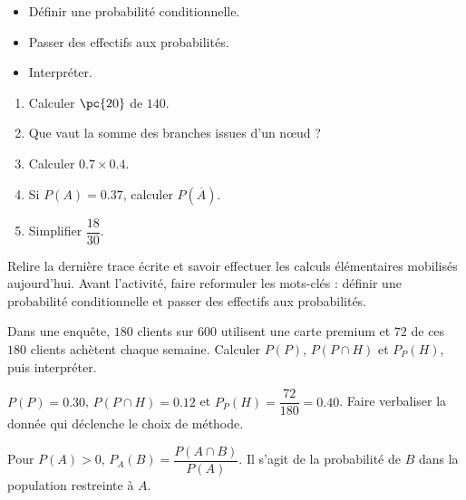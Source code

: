 \begin{objectives}\begin{itemize}\item Définir une probabilité conditionnelle.\item Passer des effectifs aux probabilités.\item Interpréter.\end{itemize}\end{objectives}
\begin{fluency}\begin{enumerate}\item Calculer $\pc{20}$ de $140$. \item Que vaut la somme des branches issues d'un nœud ? \item Calculer $\num{0,7}\times\num{0,4}$. \item Si $P(A)=\num{0,37}$, calculer $P(\overline A)$. \item Simplifier $\dfrac{18}{30}$. \end{enumerate}\end{fluency}
\begin{prerequisites}Relire la dernière trace écrite et savoir effectuer les calculs élémentaires mobilisés aujourd'hui. Avant l'activité, faire reformuler les mots-clés : définir une probabilité conditionnelle et passer des effectifs aux probabilités.\end{prerequisites}

\begin{activity}
Dans une enquête, $180$ clients sur $600$ utilisent une carte premium et $72$ de ces $180$ clients achètent chaque semaine. Calculer $P(P)$, $P(P\cap H)$ et $P_P(H)$, puis interpréter.

\end{activity}
\begin{solution}$P(P)=\num{0,30}$, $P(P\cap H)=\num{0,12}$ et $P_P(H)=\dfrac{72}{180}=\num{0,40}$. Faire verbaliser la donnée qui déclenche le choix de méthode.\end{solution}

\begin{summary}Pour $P(A)>0$, $P_A(B)=\dfrac{P(A\cap B)}{P(A)}$. Il s'agit de la probabilité de $B$ dans la population restreinte à $A$.\end{summary}

